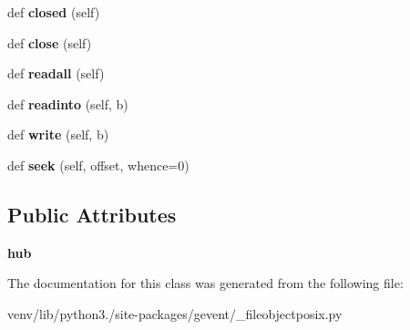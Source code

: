 \begin{DoxyCompactItemize}
def {\bfseries closed} (self)
\item 
\mbox{\label{classgevent_1_1__fileobjectposix_1_1_green_file_descriptor_i_o_ad23c9d57a1971064250a5845d561517a}} 
def {\bfseries close} (self)
\item 
\mbox{\label{classgevent_1_1__fileobjectposix_1_1_green_file_descriptor_i_o_abd9f7a18a0245b5286b447da8e4a5930}} 
def {\bfseries readall} (self)
\item 
\mbox{\label{classgevent_1_1__fileobjectposix_1_1_green_file_descriptor_i_o_ad63607ac55c30f3a96175e9bfc4b3647}} 
def {\bfseries readinto} (self, b)
\item 
\mbox{\label{classgevent_1_1__fileobjectposix_1_1_green_file_descriptor_i_o_a107f4b55fd245d840ca5fc98406f3cfa}} 
def {\bfseries write} (self, b)
\item 
\mbox{\label{classgevent_1_1__fileobjectposix_1_1_green_file_descriptor_i_o_aa78b4c4c33a0c7c6f3feff1296064896}} 
def {\bfseries seek} (self, offset, whence=0)
\end{DoxyCompactItemize}
\subsection*{Public Attributes}
\begin{DoxyCompactItemize}
\item 
\mbox{\label{classgevent_1_1__fileobjectposix_1_1_green_file_descriptor_i_o_adee792295110f47659b213cef0e87f0a}} 
{\bfseries hub}
\end{DoxyCompactItemize}


The documentation for this class was generated from the following file\+:\begin{DoxyCompactItemize}
\item 
venv/lib/python3./site-\/packages/gevent/\+\_\+fileobjectposix.\+py\end{DoxyCompactItemize}
